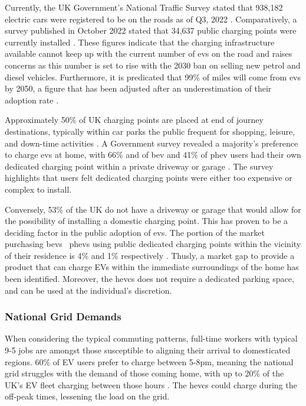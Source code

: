 \documentclass [12pt]{article}
\begin{document}
Currently, the UK Government’s National Traffic Survey stated that 938,182 electric cars were registered to be on the roads as of Q3, 2022 \cite{Q32022}. Comparatively, a survey published in October 2022 stated that 34,637 public charging points were currently installed \cite{chargestats}. These figures indicate that the charging infrastructure available cannot keep up with the current number of \gls{ev}s on the road and raises concerns as this number is set to rise with the 2030 ban on selling new petrol and diesel vehicles. Furthermore, it is predicated that 99\% of miles will come from \gls{ev}s by 2050, a figure that has been adjusted after an underestimation of their adoption rate \cite{2050rates}.

Approximately 50\% of UK charging points are placed at end of journey destinations, typically within car parks the public frequent for shopping, leisure, and down-time activities \cite{chargestats}. A Government survey revealed a majority's preference to charge \gls{ev}s at home, with 66\% and of \gls{bev} and 41\% of \gls{phev} users had their own dedicated charging point within a private driveway or garage \cite{homecharge}. The survey highlights that users felt dedicated charging points were either too expensive or complex to install.

Conversely, 53\% of the UK do not have a driveway or garage that would allow for the possibility of installing a domestic charging point. This has proven to be a deciding factor in the public adoption of \gls{ev}s. The portion of the market purchasing \gls{bev}s \ \gls{phev}s using public dedicated charging points within the vicinity of their residence is 4\% and 1\% respectively \cite{chargestats}. Thusly, a market gap to provide a product that can charge EVs within the immediate surroundings of the home has been identified. Moreover, the \gls{hevcs} does not require a dedicated parking space, and can be used at the individual's discretion.

\subsubsection{National Grid Demands}

When considering the typical commuting patterns, full-time workers with typical 9-5 jobs are amongst those susceptible to aligning their arrival to domesticated regions. 60\% of EV users prefer to charge between 5-8pm, meaning the national grid struggles with the demand of those coming home, with up to 20\% of the UK's EV fleet charging between those hours \cite{chargestats}. The \gls{hevcs} could charge during the off-peak times, lessening the load on the grid.
\end{document}
